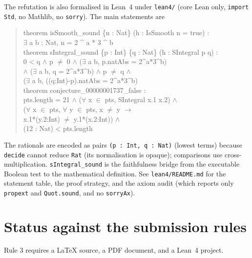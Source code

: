 \documentclass[11pt]{article}
\theoremstyle{definition}
\theoremstyle{remark}
\begin{document}
The refutation is also formalised in Lean~4 under \texttt{lean4/} (core Lean
only, \texttt{import Std}, no Mathlib, no \texttt{sorry}). The main statements
are
\begin{quote}\small\ttfamily
theorem isSmooth\_sound \{n : Nat\} (h : IsSmooth n = true) :\\
\hspace*{2em}\(\exists\) a b : Nat, n = 2 \^{} a * 3 \^{} b\\
theorem sIntegral\_sound \{p : Int\} \{q : Nat\} (h : SIntegral p q) :\\
\hspace*{2em}0 < q \(\wedge\) p \(\ne\) 0 \(\wedge\) (\(\exists\) a b, p.natAbs = 2\^{}a*3\^{}b)\\
\hspace*{2em}\(\wedge\) (\(\exists\) a b, q = 2\^{}a*3\^{}b) \(\wedge\) p \(\ne\) q \(\wedge\)\\
\hspace*{2em}(\(\exists\) a b, ((q:Int)-p).natAbs = 2\^{}a*3\^{}b)\\
theorem conjecture\_00000001737\_false :\\
\hspace*{2em}pts.length = 21 \(\wedge\) (\(\forall\) x \(\in\) pts, SIntegral x.1 x.2) \(\wedge\)\\
\hspace*{2em}(\(\forall\) x \(\in\) pts, \(\forall\) y \(\in\) pts, x \(\ne\) y \(\to\)\\
\hspace*{4em}x.1*(y.2:Int) \(\ne\) y.1*(x.2:Int)) \(\wedge\)\\
\hspace*{2em}(12 : Nat) < pts.length
\end{quote}
The rationals are encoded as pairs \texttt{(p : Int, q : Nat)} (lowest terms)
because \texttt{decide} cannot reduce \texttt{Rat} (its normalisation is
opaque); comparisons use cross-multiplication. \texttt{sIntegral\_sound} is the
faithfulness bridge from the executable Boolean test to the mathematical
definition. See \texttt{lean4/README.md} for the statement table, the proof
strategy, and the axiom audit (which reports only \texttt{propext} and
\texttt{Quot.sound}, and no \texttt{sorryAx}).

\section*{Status against the submission rules}

Rule 3 requires a LaTeX source, a PDF document, and a Lean~4 project.
\end{document}
